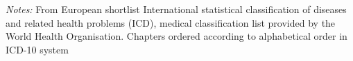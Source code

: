 \documentclass{scrartcl} %
\begin{document}
\begin{table}[h]
\begin{threeparttable}
\begin{tabular}{lrrr}
\bottomrule %
\end{tabular}
\begin{tablenotes}
      \scriptsize{ \item \textit{Notes:} From European shortlist
      International statistical classification of diseases and related health problems (ICD), medical classification list provided by the World Health Organisation. Chapters ordered according to alphabetical order in ICD-10 system}
    \end{tablenotes}
  \end{threeparttable}
\end{table}
\end{document}
